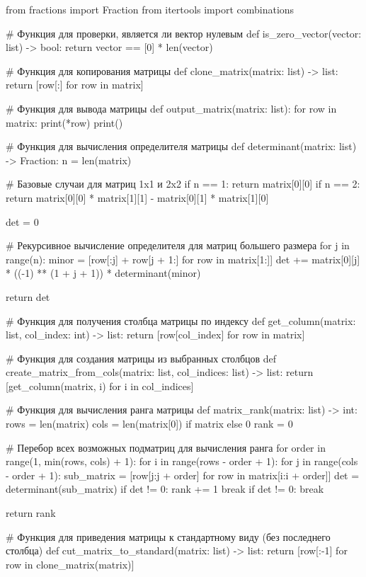 \documentclass{report}
\begin{document}
	\begin{code}
from fractions import Fraction
from itertools import combinations
		
# Функция для проверки, является ли вектор нулевым
def is_zero_vector(vector: list) -> bool:
   return vector == [0] * len(vector)
		
# Функция для копирования матрицы
def clone_matrix(matrix: list) -> list:
   return [row[:] for row in matrix]
		
# Функция для вывода матрицы
def output_matrix(matrix: list):
   for row in matrix:
	   print(*row)
   print()

# Функция для вычисления определителя матрицы
def determinant(matrix: list) -> Fraction:
   n = len(matrix)

   # Базовые случаи для матриц 1x1 и 2x2
   if n == 1:
	   return matrix[0][0]
   if n == 2:
	   return matrix[0][0] * matrix[1][1] - matrix[0][1] * matrix[1][0]

   det = 0

   # Рекурсивное вычисление определителя для матриц большего размера
   for j in range(n):
	   minor = [row[:j] + row[j + 1:] for row in matrix[1:]]
	   det += matrix[0][j] * ((-1) ** (1 + j + 1)) * determinant(minor)

   return det

# Функция для получения столбца матрицы по индексу
def get_column(matrix: list, col_index: int) -> list:
   return [row[col_index] for row in matrix]

# Функция для создания матрицы из выбранных столбцов
def create_matrix_from_cols(matrix: list, col_indices: list) -> list:
   return [get_column(matrix, i) for i in col_indices]

# Функция для вычисления ранга матрицы
def matrix_rank(matrix: list) -> int:
   rows = len(matrix)
   cols = len(matrix[0]) if matrix else 0
   rank = 0

   # Перебор всех возможных подматриц для вычисления ранга
   for order in range(1, min(rows, cols) + 1):
	   for i in range(rows - order + 1):
		   for j in range(cols - order + 1):
			   sub_matrix = [row[j:j + order] for row in matrix[i:i + order]]
			   det = determinant(sub_matrix)
			   if det != 0:
				   rank += 1
				   break
		   if det != 0:
			   break

   return rank

# Функция для приведения матрицы к стандартному виду (без последнего столбца)
def cut_matrix_to_standard(matrix: list) -> list:
   return [row[:-1] for row in clone_matrix(matrix)]


\end{code}
\end{document}
